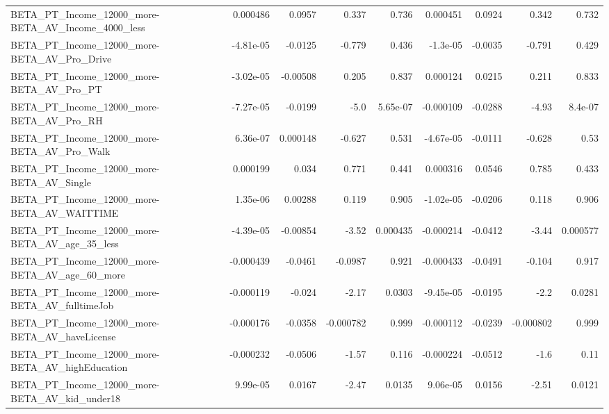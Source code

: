 \begin{tabular}{lrrrrrrrr}
BETA\_PT\_Income\_12000\_more-BETA\_AV\_Income\_4000\_less &    0.000486 &       0.0957 &     0.337 &    0.736 &   0.000451 &      0.0924 &        0.342 &         0.732 \\
BETA\_PT\_Income\_12000\_more-BETA\_AV\_Pro\_Drive        &   -4.81e-05 &      -0.0125 &    -0.779 &    0.436 &   -1.3e-05 &     -0.0035 &       -0.791 &         0.429 \\
BETA\_PT\_Income\_12000\_more-BETA\_AV\_Pro\_PT           &   -3.02e-05 &     -0.00508 &     0.205 &    0.837 &   0.000124 &      0.0215 &        0.211 &         0.833 \\
BETA\_PT\_Income\_12000\_more-BETA\_AV\_Pro\_RH           &   -7.27e-05 &      -0.0199 &      -5.0 & 5.65e-07 &  -0.000109 &     -0.0288 &        -4.93 &       8.4e-07 \\
BETA\_PT\_Income\_12000\_more-BETA\_AV\_Pro\_Walk         &    6.36e-07 &     0.000148 &    -0.627 &    0.531 &  -4.67e-05 &     -0.0111 &       -0.628 &          0.53 \\
BETA\_PT\_Income\_12000\_more-BETA\_AV\_Single           &    0.000199 &        0.034 &     0.771 &    0.441 &   0.000316 &      0.0546 &        0.785 &         0.433 \\
BETA\_PT\_Income\_12000\_more-BETA\_AV\_WAITTIME         &    1.35e-06 &      0.00288 &     0.119 &    0.905 &  -1.02e-05 &     -0.0206 &        0.118 &         0.906 \\
BETA\_PT\_Income\_12000\_more-BETA\_AV\_age\_35\_less      &   -4.39e-05 &     -0.00854 &     -3.52 & 0.000435 &  -0.000214 &     -0.0412 &        -3.44 &      0.000577 \\
BETA\_PT\_Income\_12000\_more-BETA\_AV\_age\_60\_more      &   -0.000439 &      -0.0461 &   -0.0987 &    0.921 &  -0.000433 &     -0.0491 &       -0.104 &         0.917 \\
BETA\_PT\_Income\_12000\_more-BETA\_AV\_fulltimeJob      &   -0.000119 &       -0.024 &     -2.17 &   0.0303 &  -9.45e-05 &     -0.0195 &         -2.2 &        0.0281 \\
BETA\_PT\_Income\_12000\_more-BETA\_AV\_haveLicense      &   -0.000176 &      -0.0358 & -0.000782 &    0.999 &  -0.000112 &     -0.0239 &    -0.000802 &         0.999 \\
BETA\_PT\_Income\_12000\_more-BETA\_AV\_highEducation    &   -0.000232 &      -0.0506 &     -1.57 &    0.116 &  -0.000224 &     -0.0512 &         -1.6 &          0.11 \\
BETA\_PT\_Income\_12000\_more-BETA\_AV\_kid\_under18      &    9.99e-05 &       0.0167 &     -2.47 &   0.0135 &   9.06e-05 &      0.0156 &        -2.51 &        0.0121 \\

\end{tabular}
